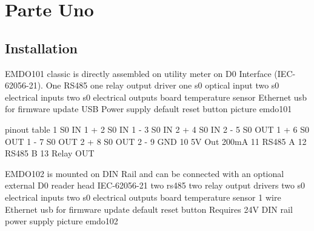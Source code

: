 \documentclass[11pt,fleqn]{book} %
\numberwithin{equation}{section} %
\numberwithin{figure}{section} %
\numberwithin{table}{section} %
\begin{document}




\pagestyle{empty} %

 \tableofcontents %

\cleardoublepage %

\pagestyle{fancy} %


\part{Parte Uno}



\chapter{Installation}

EMDO101 classic is directly assembled on utility meter on D0 Interface (IEC-62056-21). 
One RS485
one relay output driver
one s0 optical input 
two s0 electrical inputs
two s0 electrical outputs
board temperature sensor
Ethernet 
usb for firmware update
USB Power supply
default reset button
picture emdo101

pinout table
1 S0 IN 1 +
2 S0 IN 1 -
3 S0 IN 2 +
4 S0 IN 2 -
5 S0 OUT 1 +
6 S0 OUT 1 -
7 S0 OUT 2 +
8 S0 OUT 2 -
9 GND
10 5V Out 200mA
11 RS485 A
12 RS485 B
13 Relay OUT

EMDO102 is mounted on DIN Rail and can be connected with an optional external D0 reader head IEC-62056-21
two rs485
two relay output drivers
two s0 electrical inputs
two s0 electrical outputs
board temperature sensor
1 wire
Ethernet 
usb for firmware update
default reset button
Requires 24V DIN rail power supply
picture emdo102
\end{document}
